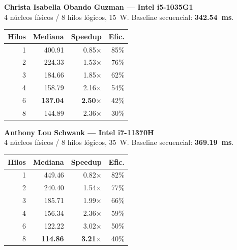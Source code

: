 \documentclass[11pt,a4paper]{article}
\begin{document}
\vspace{0.5em}
\begin{minipage}[t]{0.48\textwidth}
\textbf{Christa Isabella Obando Guzman --- Intel i5-1035G1}\\
{\footnotesize 4 núcleos físicos / 8 hilos lógicos, 15~W. Baseline secuencial:
\textbf{342.54~ms}.}
\begin{center}\footnotesize
\begin{tabular}{rrrr}
\toprule
Hilos & Mediana & Speedup & Efic. \\
\midrule
1 & 400.91 & 0.85$\times$ & 85\% \\
2 & 224.33 & 1.53$\times$ & 76\% \\
3 & 184.66 & 1.85$\times$ & 62\% \\
4 & 158.79 & 2.16$\times$ & 54\% \\
6 & \textbf{137.04} & \textbf{2.50$\times$} & 42\% \\
8 & 144.89 & 2.36$\times$ & 30\% \\
\bottomrule
\end{tabular}
\end{center}
\end{minipage}
\hfill
\begin{minipage}[t]{0.48\textwidth}
\textbf{Anthony Lou Schwank --- Intel i7-11370H}\\
{\footnotesize 4 núcleos físicos / 8 hilos lógicos, 35~W. Baseline secuencial:
\textbf{369.19~ms}.}
\begin{center}\footnotesize
\begin{tabular}{rrrr}
\toprule
Hilos & Mediana & Speedup & Efic. \\
\midrule
1 & 449.46 & 0.82$\times$ & 82\% \\
2 & 240.40 & 1.54$\times$ & 77\% \\
3 & 185.71 & 1.99$\times$ & 66\% \\
4 & 156.34 & 2.36$\times$ & 59\% \\
6 & 122.22 & 3.02$\times$ & 50\% \\
8 & \textbf{114.86} & \textbf{3.21$\times$} & 40\% \\
\bottomrule
\end{tabular}
\end{center}
\end{minipage}
\end{document}
